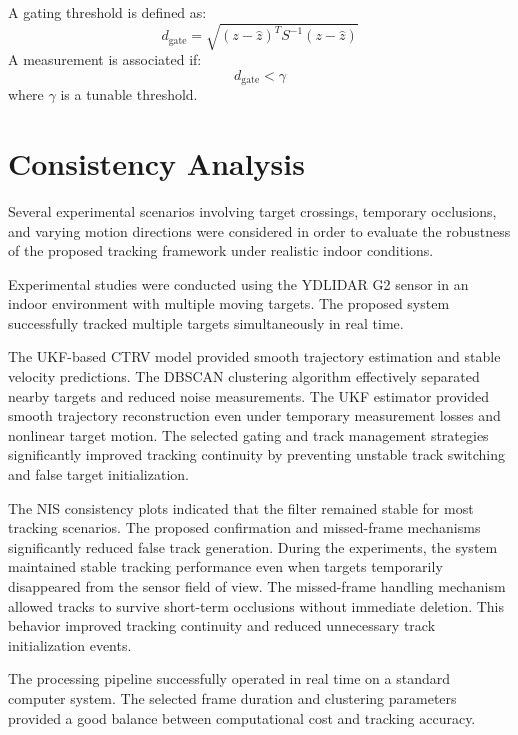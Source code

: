 \documentclass[conference]{IEEEtran}
\begin{document}
A gating threshold is defined as:
\begin{equation}
d_{\text{gate}}=\sqrt{(z-\hat{z})^{T}S^{-1}(z-\hat{z})}
\end{equation}
A measurement is associated if:
\begin{equation}
d_{\text{gate}} < \gamma
\end{equation}
where $\gamma$ is a tunable threshold.

\section{Consistency Analysis}
Several experimental scenarios involving target crossings, temporary occlusions, and varying motion directions were considered in order to evaluate the robustness of the proposed tracking framework under realistic indoor conditions.

Experimental studies were conducted using the YDLIDAR G2 sensor in an indoor environment with multiple moving targets. The proposed system successfully tracked multiple targets simultaneously in real time.

The UKF-based CTRV model provided smooth trajectory estimation and stable velocity predictions. The DBSCAN clustering algorithm effectively separated nearby targets and reduced noise measurements. The UKF estimator provided smooth trajectory reconstruction even under temporary measurement losses and nonlinear target motion. The selected gating and track management strategies significantly improved tracking continuity by preventing unstable track switching and false target initialization.

The NIS consistency plots indicated that the filter remained stable for most tracking scenarios. The proposed confirmation and missed-frame mechanisms significantly reduced false track generation. During the experiments, the system maintained stable tracking performance even when targets temporarily disappeared from the sensor field of view. The missed-frame handling mechanism allowed tracks to survive short-term occlusions without immediate deletion. This behavior improved tracking continuity and reduced unnecessary track initialization events.

The processing pipeline successfully operated in real time on a standard computer system. The selected frame duration and clustering parameters provided a good balance between computational cost and tracking accuracy.
\end{document}
